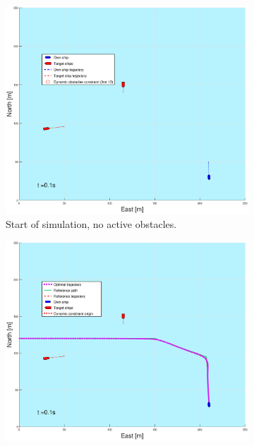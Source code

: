 \clearpage
\begin{figure}[!ht] %
    \begin{subfigure}{0.49\textwidth}
        \centering
        \includegraphics[width=\textwidth]{Images/Figures/Extra_Stuff/BlockedPath_Pos_t=1}
        \caption{Start of simulation, no active obstacles.}
    \end{subfigure}
    \begin{subfigure}{0.499\textwidth}
        \centering
        \includegraphics[width=\textwidth]{Images/Figures/Extra_Stuff/BlockedPath_Wopt_t=1}

\end{subfigure}
\end{figure}

